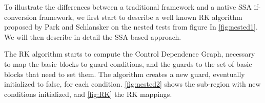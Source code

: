 To illustrate the differences between a traditional framework and a native SSA if-conversion framework, we first start to describe a well known RK algorithm proposed by Park and Schlansker  on the nested tests from figure In \ref{fig:nested1}. We will then describe in detail the SSA based approach.

The RK algorithm starts to compute the Control Dependence Graph, necessary to map the basic blocks to guard conditions, and the guards to the set of basic blocks that need to set them. The algorithm creates a new guard, eventually initialized to false, for each condition. \ref{fig:nested2} shows the sub-region with new conditions initialized, and \ref{fig:RK} the RK mappings.

\begin{figure}
\centering
\end{figure}
